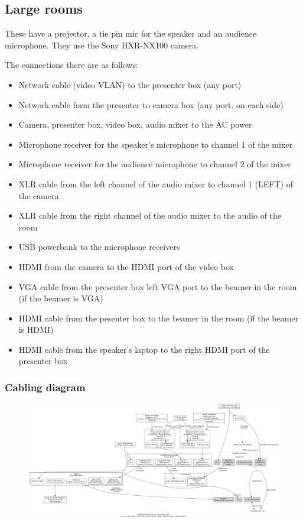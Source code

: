 \documentclass{article}
\begin{document}
\subsection{Large rooms}
These have a projector, a tie pin mic for the speaker and an audience microphone. They use the Sony HXR-NX100 camera. 

The connections there are as follows:

\begin{itemize}
  \item Network cable (video VLAN) to the presenter box (any port)
  \item Network cable form the presenter to camera box (any port, on each side)
  \item Camera, presenter box, video box, audio mixer to the AC power
  \item Microphone receiver for the speaker's microphone to channel 1 of the mixer
  \item Microphone receiver for the audience microphone to channel 2 of the mixer
  \item XLR cable from the left channel of the audio mixer to channel 1 (LEFT) of the camera
  \item XLR cable from the right channel of the audio mixer to the audio of the room
  \item USB powerbank to the microphone receivers
  \item HDMI from the camera to the HDMI port of the video box
  \item VGA cable from the presenter box left VGA port to the beamer in the room (if the beamer is VGA)
  \item HDMI cable from the pesenter box to the beamer in the room (if the beamer is HDMI)
  \item HDMI cable from the speaker's laptop to the right HDMI port of the presenter box
\end{itemize}
\subsubsection{Cabling diagram}
\begin{figure}[H]
  \begin{sideways}
  \centering
  \includegraphics[width = 200mm]{../../graph/cabling_large_rooms.png}
  \end{sideways}
\end{figure}
\end{document}

